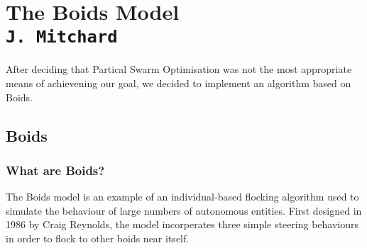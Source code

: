 \pagestyle{empty}

\section{The Boids Model\\{\small\tt J.~Mitchard}}
After deciding that Partical Swarm Optimisation was not the most appropriate means of achievening our goal, we decided to implement an algorithm based on Boids.

\subsection{Boids}
\subsubsection{What are Boids?}
The Boids model is an example of an individual-based flocking algorithm used to simulate the behaviour of large numbers of autonomous entities. First designed in 1986 by Craig Reynolds, the model incorperates three simple steering behaviours in order to flock to other boids near itself.

